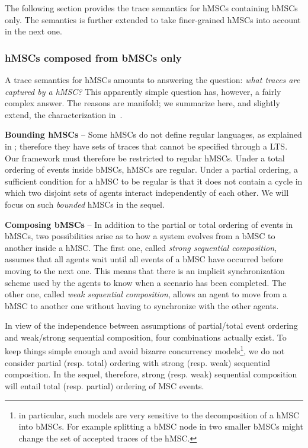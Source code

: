 The following section provides the trace semantics for hMSCs containing bMSCs only. The semantics is further extended to take finer-grained hMSCs into account in the next one. 

\subsubsection*{hMSCs composed from bMSCs only}

A trace semantics for hMSCs amounts to answering the question: \emph{what traces are captured by a hMSC?} This apparently simple question has, however, a fairly complex answer. The reasons are manifold; we summarize here, and slightly extend, the characterization in~\cite{Uchitel:2004}.

\noindent \textbf{Bounding hMSCs} -- Some hMSCs do not define regular languages, as explained in \cite{Henriksen:2000}; therefore they have sets of traces that cannot be specified through a LTS. Our framework must therefore be restricted to regular hMSCs. Under a total ordering of events inside bMSCs, hMSCs are regular. Under a partial ordering, a sufficient condition for a hMSC to be regular is that it does not contain a cycle in which two disjoint sets of agents interact independently of each other. We will focus on such \emph{bounded} hMSCs in the sequel.

\noindent \textbf{Composing bMSCs} -- In addition to the partial or total ordering of events in bMSCs, two possibilities arise as to how a system evolves from a bMSC to another inside a hMSC. The first one, called \emph{strong sequential composition}, assumes that all agents wait until all events of a bMSC have occurred before moving to the next one. This means that there is an implicit synchronization scheme used by the agents to know when a scenario has been completed. The other one, called \emph{weak sequential composition}, allows an agent to move from a bMSC to another one without having to synchronize with the other agents. 

In view of the independence between assumptions of partial/total event ordering and weak/strong sequential composition, four combinations actually exist. To keep things simple enough and avoid bizarre concurrency models\footnote{in particular, such models are very sensitive to the decomposition of a hMSC into bMSCs. For example splitting a bMSC node in two smaller bMSCs might change the set of accepted traces of the hMSC.}, we do not consider partial (resp. total) ordering with strong (resp. weak) sequential composition. In the sequel, therefore, strong (resp. weak) sequential composition will entail total (resp. partial) ordering of MSC events.

